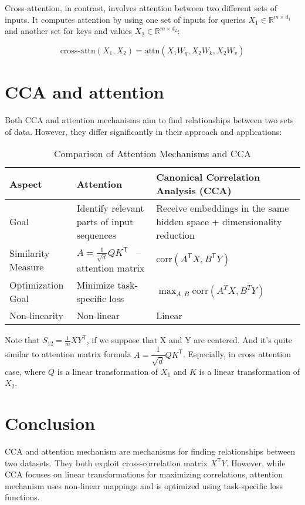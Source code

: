 \documentclass[a4paper,14pt]{article}
\newcommand{\dR}{\mathbb{R}}
\newcommand{\T}{^{\mathsf{T}}}
\theoremstyle{plain} %
\theoremstyle{definition} %
\theoremstyle{remark} %
\begin{document}
	Cross-attention, in contrast, involves attention between two different sets of inputs. It computes attention by using one set of inputs for queries $X_1 \in \dR^{m \times d_1}$ and another set for keys and values $X_2 \in \dR^{m \times d_2}$:
	
	\[
	\text{cross-attn}(X_1, X_2) = \text{attn}(X_1 W_q, X_2 W_k, X_2 W_v)
	\]
	
	\section*{CCA and attention}
	
	Both CCA and attention mechanisms aim to find relationships between two sets of data. However, they differ significantly in their approach and applications:
	
	\begin{table}[bhtp]
		\centering
		\begin{tabular}{|p{4cm}|p{5cm}|p{5cm}|}
			\hline
			\textbf{Aspect} & \textbf{Attention} & \textbf{Canonical Correlation Analysis (CCA)} \\
			\hline
			Goal & Identify relevant parts of input sequences & Receive embeddings in the same hidden space + dimensionality reduction \\
			\hline
			Similarity Measure & $A = \frac{1}{\sqrt{d}} Q K\T$ ~-- attention matrix & $\text{corr}(A\T X, B\T Y)$ \\
			\hline
			Optimization Goal & Minimize task-specific loss & $\max_{A,B} \text{corr}(A^T X, B^T Y)$ \\
			\hline
			Non-linearity & Non-linear & Linear \\
			\hline
		\end{tabular}
		\caption{Comparison of Attention Mechanisms and CCA}
	\end{table}
	
	Note that $S_{12} = \frac{1}{m} X Y\T$, if we suppose that X and Y are centered. And it's quite similar to attention matrix formula $A = \dfrac{1}{\sqrt{d}} Q K\T$. Especially, in cross attention case, where $Q$ is a linear transformation of $X_1$ and $K$ is a linear transformation of $X_2$.

	\section*{Conclusion}
	CCA and attention mechanism are mechanisms for finding relationships between two datasets. They both exploit cross-correlation matrix $X\T Y$. However, while CCA focuses on linear transformations for maximizing correlations, attention mechanism uses non-linear mappings and is optimized using task-specific loss functions.
	
\end{document}
